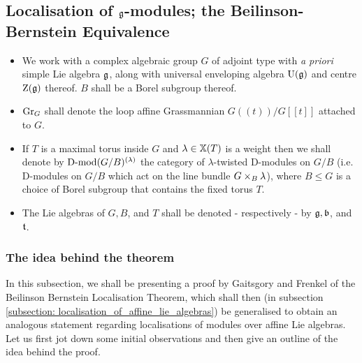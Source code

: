         \subsection{Localisation of \texorpdfstring{$\mathfrak{g}$}{}-modules; the Beilinson-Bernstein Equivalence}
            \begin{convention} \label{conv: beilinson_bernstein_localisation_conventions}
                \noindent
                \begin{itemize}
                    \item We work with a complex algebraic group $G$ of adjoint type with \textit{a priori} simple Lie algebra $\mathfrak{g}$, along with universal enveloping algebra $\mathrm{U}(\mathfrak{g})$ and centre $\mathrm{Z}(\mathfrak{g})$ thereof. $B$ shall be a Borel subgroup thereof. 
                    \item $\mathrm{Gr}_G$ shall denote the loop affine Grassmannian $G(\!(t)\!)/G[\![t]\!]$ attached to $G$.
                    \item If $T$ is a maximal torus inside $G$ and $\lambda \in \mathbb{X}(T)$ is a weight then we shall denote by $\mathrm{D}\text{-}\mathrm{mod}(G/B)^{(\lambda)}$ the category of $\lambda$-twisted D-modules on $G/B$ (i.e. D-modules on $G/B$ which act on the line bundle $G \x_B \lambda$), where $B \leq G$ is a choice of Borel subgroup that contains the fixed torus $T$.
                    \item The Lie algebras of $G, B$, and $T$ shall be denoted - respectively - by $\mathfrak{g}, \mathfrak{b}$, and $\mathfrak{t}$.
                \end{itemize}
            \end{convention}
            
            \subsubsection{The idea behind the theorem}
                In this subsection, we shall be presenting a proof by Gaitsgory and Frenkel of the Beilinson Bernstein Localisation Theorem, which shall then (in subsection \ref{subsection: localisation_of_affine_lie_algebras}) be generalised to obtain an analogous statement regarding localisations of modules over affine Lie algebras. Let us first jot down some initial observations and then give an outline of the idea behind the proof.
                
